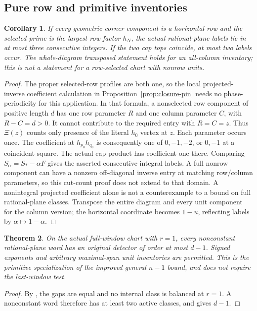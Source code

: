 \documentclass[11pt,a4paper]{amsart}
\numberwithin{equation}{section}
\theoremstyle{plain}
\newtheorem{theorem}{Theorem}[section]
\newtheorem{corollary}[theorem]{Corollary}
\theoremstyle{definition}
\begin{document}
\subsection{Pure row and primitive inventories}

\begin{corollary}\label{cor:row-pencil}
If every geometric corner component is a horizontal row and the selected prime is the largest row factor \(h_N\), the actual rational-plane labels lie in at most three consecutive integers.  If the two cap tops coincide, at most two labels occur.  The whole-diagram transposed statement holds for an all-column inventory; this is not a statement for a row-selected chart with nonrow units.
\end{corollary}
\begin{proof}
The proper selected-row profiles are both one, so the local projected-inverse coefficient calculation in Proposition~\ref{prop:closure-pin} needs no phase-periodicity for this application.  In that formula, a nonselected row component of positive length \(d\) has one row parameter \(R\) and one column parameter \(C\), with \(R-C=d>0\).  It cannot contribute to the required entry with \(R=C=z\).  Thus \(\Xi(z)\) counts only presence of the literal \(h_0\) vertex at \(z\).  Each parameter occurs once.  The coefficient at \(h_{p_0}h_{q_0}\) is consequently one of \(0,-1,-2\), or \(0,-1\) at a coincident square.  The actual cap product has coefficient one there.  Comparing \(S_\alpha=S_*-\alpha F\) gives the asserted consecutive integral labels.  A full nonrow component can have a nonzero off-diagonal inverse entry at matching row/column parameters, so this cut-count proof does not extend to that domain.  A nonintegral projected coefficient alone is not a counterexample to a bound on full rational-plane classes.  Transpose the entire diagram and every unit component for the column version; the horizontal coordinate becomes \(1-u\), reflecting labels by \(\alpha\mapsto1-\alpha\).
\end{proof}

\begin{theorem}\label{thm:primitive-short}
On the actual full-window chart with \(r=1\), every nonconstant rational-plane word has an original detector of order at most \(d-1\).  Signed exponents and arbitrary maximal-span unit inventories are permitted.  This is the primitive specialization of the improved general \(n-1\) bound, and does not require the last-window test.
\end{theorem}
\begin{proof}
By , the gaps are equal and no internal class is balanced at \(r=1\).  A nonconstant word therefore has at least two active classes, and  gives \(d-1\).
\end{proof}
\end{document}

